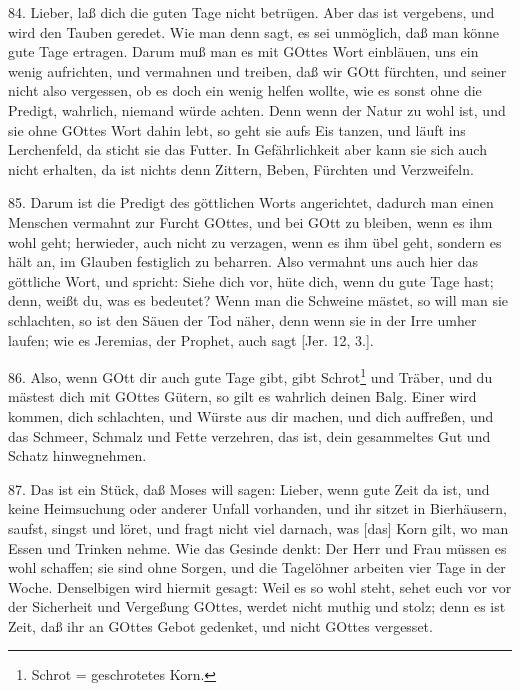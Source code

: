 84. Lieber, laß dich die guten Tage nicht betrügen. Aber das ist vergebens, und wird den Tauben geredet. Wie man denn sagt, es sei unmöglich, daß man könne gute Tage ertragen. Darum muß man es mit GOttes Wort einbläuen, uns ein wenig aufrichten, und vermahnen und treiben, daß wir GOtt fürchten, und seiner nicht also vergessen, ob es doch ein wenig helfen wollte, wie es sonst ohne die Predigt, wahrlich, niemand würde achten. Denn wenn der Natur zu wohl ist, und sie ohne GOttes Wort dahin lebt, so geht sie aufs Eis tanzen, und läuft ins Lerchenfeld, da sticht sie das Futter. In Gefährlichkeit aber kann sie sich auch nicht erhalten, da ist nichts denn Zittern, Beben, Fürchten und Verzweifeln.

85. Darum ist die Predigt des göttlichen Worts angerichtet, dadurch man einen Menschen vermahnt zur Furcht GOttes, und bei GOtt zu bleiben, wenn es ihm wohl geht; herwieder, auch nicht zu verzagen, wenn es ihm übel geht, sondern es hält an, im Glauben festiglich zu beharren. Also vermahnt uns auch hier das göttliche Wort, und spricht: Siehe dich vor, hüte dich, wenn du gute Tage hast; denn, weißt du, was es bedeutet? Wenn man die Schweine mästet, so will man sie schlachten, so ist den Säuen der Tod näher, denn wenn sie in der Irre umher laufen; wie es Jeremias, der Prophet, auch sagt [Jer. 12, 3.].

86. Also, wenn GOtt dir auch gute Tage gibt, gibt Schrot\footnote{Schrot = geschrotetes Korn.} und Träber, und du mästest dich mit GOttes Gütern, so gilt es wahrlich deinen Balg. Einer wird kommen, dich schlachten, und Würste aus dir machen, und dich auffreßen, und das Schmeer, Schmalz und Fette verzehren, das ist, dein gesammeltes Gut und Schatz hinwegnehmen.

87. Das ist ein Stück, daß Moses will sagen: Lieber, wenn gute Zeit da ist, und keine Heimsuchung oder anderer Unfall vorhanden, und ihr sitzet in Bierhäusern, saufst, singst und löret, und fragt nicht viel darnach, was [das] Korn gilt, wo man Essen und Trinken nehme. Wie das Gesinde denkt: Der Herr und Frau müssen es wohl schaffen; sie sind ohne Sorgen, und die Tagelöhner arbeiten vier Tage in der Woche. Denselbigen wird hiermit gesagt: Weil es so wohl steht, sehet euch vor vor der Sicherheit und Vergeßung GOttes, werdet nicht muthig und stolz; denn es ist Zeit, daß ihr an GOttes Gebot gedenket, und nicht GOttes vergesset.

